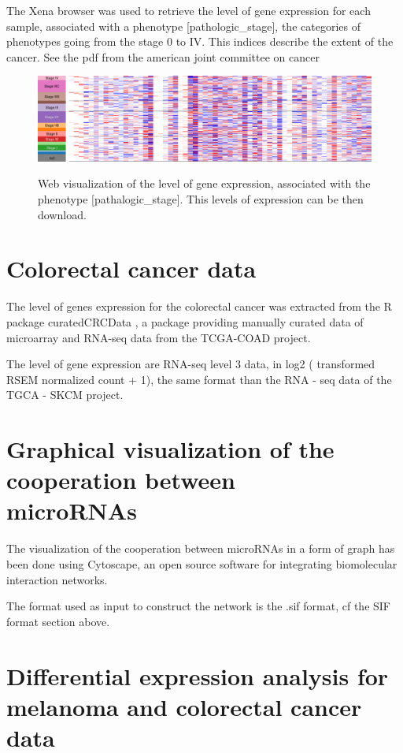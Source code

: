 \documentclass[a4paper,12pt]{report}
\begin{document}
The Xena browser was used to retrieve the level of gene expression for each sample, associated with a phenotype [pathologic\_stage], the categories of phenotypes going from the stage 0 to IV. This indices describe the extent of the cancer. See the pdf from the american joint committee on cancer \cite{joint}


\begin{figure}[H]
	\centering
	{\includegraphics[width=1\textwidth]{Xena_melanoma.pdf}}
	\caption{Web visualization of the level of gene expression, associated with the phenotype [pathalogic\_stage]. This levels of expression can be then download.}
\end{figure}

\section{Colorectal cancer data}

The level of genes expression for the colorectal cancer was extracted from the R package curatedCRCData \cite{curated}, a package providing manually curated data of microarray and RNA-seq data from the TCGA-COAD project.

The level of gene expression are RNA-seq level 3 data, in log2 ( transformed RSEM normalized count + 1), the same format than the RNA - seq data of the TGCA - SKCM project.

\section{Graphical visualization of the cooperation between \\ microRNAs}

The  visualization of the cooperation between microRNAs in a form of graph has been done using Cytoscape\cite{cytoscape}, an open source software for integrating biomolecular interaction networks.

The format used as input to construct the network is the .sif format, cf the SIF format section above.


\section{Differential expression analysis for melanoma and colorectal cancer data}
\end{document}
